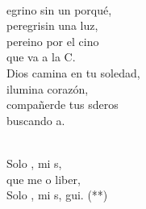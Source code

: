 \begin{cancion}
	\jump\\
	egrino sin un porqué,\\
	peregrisin una luz,\\
	pereino por el cino \\
	que va a la C. \\
Dios camina en tu soledad,\\
	ilumina corazón,\\
	compañerde tus sderos \\
	buscando a. \\\jump\\
	\begin{chorus}%
	Solo , mi s,\\
	que me o liber,\\
	Solo , mi s, gui. (**) \\
	\end{chorus}%
	\jump\\
\end{cancion}%
